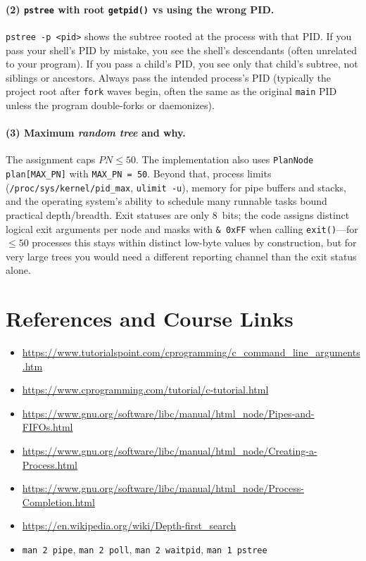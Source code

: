 \documentclass[11pt,a4paper]{article}
\begin{document}
\paragraph{(2) \texttt{pstree} with root \texttt{getpid()} vs using the wrong PID.}
\texttt{pstree -p <pid>} shows the subtree rooted at the process with that PID. If you pass your shell's PID by mistake, you see the shell's descendants (often unrelated to your program). If you pass a child's PID, you see only that child's subtree, not siblings or ancestors. Always pass the intended process's PID (typically the project root after \texttt{fork} waves begin, often the same as the original \texttt{main} PID unless the program double-forks or daemonizes).

\paragraph{(3) Maximum \emph{random tree} and why.}
The assignment caps $PN \leq 50$. The implementation also uses \texttt{PlanNode plan[MAX\_PN]} with \texttt{MAX\_PN = 50}. Beyond that, process limits (\texttt{/proc/sys/kernel/pid\_max}, \texttt{ulimit -u}), memory for pipe buffers and stacks, and the operating system's ability to schedule many runnable tasks bound practical depth/breadth. Exit statuses are only 8~bits; the code assigns distinct logical exit arguments per node and masks with \texttt{\& 0xFF} when calling \texttt{exit()}---for $\leq 50$ processes this stays within distinct low-byte values by construction, but for very large trees you would need a different reporting channel than the exit status alone.

\section{References and Course Links}
\begin{itemize}
  \item \url{https://www.tutorialspoint.com/cprogramming/c_command_line_arguments.htm}
  \item \url{https://www.cprogramming.com/tutorial/c-tutorial.html}
  \item \url{https://www.gnu.org/software/libc/manual/html_node/Pipes-and-FIFOs.html}
  \item \url{https://www.gnu.org/software/libc/manual/html_node/Creating-a-Process.html}
  \item \url{https://www.gnu.org/software/libc/manual/html_node/Process-Completion.html}
  \item \url{https://en.wikipedia.org/wiki/Depth-first_search}
  \item \texttt{man 2 pipe}, \texttt{man 2 poll}, \texttt{man 2 waitpid}, \texttt{man 1 pstree}
\end{itemize}
\end{document}
